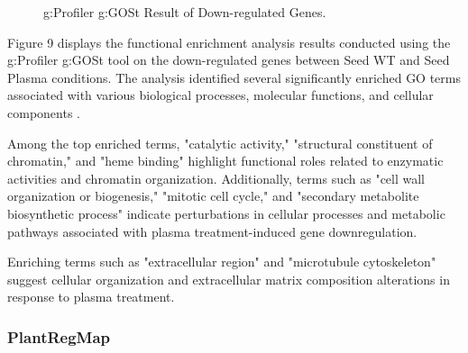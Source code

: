 \documentclass[12pt,letterpaper]{article}
\begin{document}
\begin{figure}[H]
    \centering
    \caption{g:Profiler g:GOSt Result of Down-regulated Genes.}
    \label{fig:enter-label}
\end{figure}

Figure 9 displays the functional enrichment analysis results conducted using the g:Profiler g:GOSt tool on the down-regulated genes between Seed WT and Seed Plasma conditions. The analysis identified several significantly enriched GO terms associated with various biological processes, molecular functions, and cellular components \parencite{reimand2007gProfiler}.

Among the top enriched terms, "catalytic activity," "structural constituent of chromatin," and "heme binding" highlight functional roles related to enzymatic activities and chromatin organization. Additionally, terms such as "cell wall organization or biogenesis," "mitotic cell cycle," and "secondary metabolite biosynthetic process" indicate perturbations in cellular processes and metabolic pathways associated with plasma treatment-induced gene downregulation.

Enriching terms such as "extracellular region" and "microtubule cytoskeleton" suggest cellular organization and extracellular matrix composition alterations in response to plasma treatment.

\subsubsection{PlantRegMap}
\end{document}
